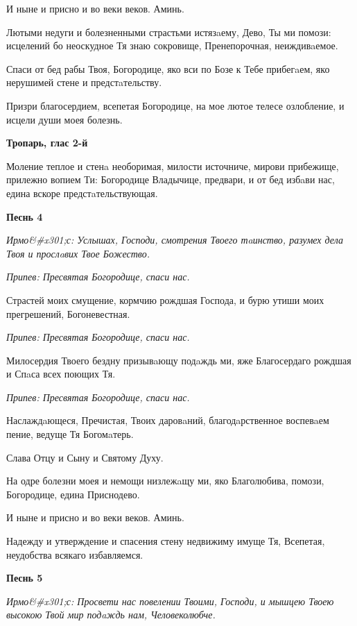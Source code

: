 И ныне и присно и во веки веков. Аминь.


Лютыми недуги и болезненными страстьми истязaему, Дево, Ты ми помози: исцелений бо неоскудное Тя знаю сокровище, Пренепорочная, неиждивaемое.


Спаси от бед рабы Твоя, Богородице, яко вси по Бозе к Тебе прибегaем, яко нерушимей стене и предстaтельству.


Призри благосердием, всепетая Богородице, на мое лютое телесе озлобление, и исцели души моея болезнь.




\bfseries Тропарь, глас 2-й\normalfont{}


Моление теплое и стенa необоримая, милости источниче, мирови прибежище, прилежно вопием Ти: Богородице Владычице, предвари, и от бед избaви нас, едина вскоре предстaтельствующая.




\bfseries Песнь 4\normalfont{}


\itshape Ирмо&#x301;с:\normalfont{} Услышах, Господи, смотрения Твоего тaинство, разумех дела Твоя и прослaвих Твое Божество.


\itshape Припев:\normalfont{} Пресвятая Богородице, спаси нас.


Страстей моих смущение, кормчию рождшая Господа, и бурю утиши моих прегрешений, Богоневестная.


\itshape Припев:\normalfont{} Пресвятая Богородице, спаси нас.


Милосердия Твоего бездну призывaющу подaждь ми, яже Благосердаго рождшая и Спaса всех поющих Тя.


\itshape Припев:\normalfont{} Пресвятая Богородице, спаси нас.


Наслаждaющеся, Пречистая, Твоих даровaний, благодaрственное воспевaем пение, ведуще Тя Богомaтерь.


Слава Отцу и Сыну и Святому Духу.


На одре болезни моея и немощи низлежaщу ми, яко Благолюбива, помози, Богородице, едина Приснодево.


И ныне и присно и во веки веков. Аминь.


Надежду и утверждение и спасения стену недвижиму имуще Тя, Всепетая, неудобства всякаго избавляемся.




\bfseries Песнь 5\normalfont{}


\itshape Ирмо&#x301;с:\normalfont{} Просвети нас повелении Твоими, Господи, и мышцею Твоею высокою Твой мир подaждь нам, Человеколюбче.


